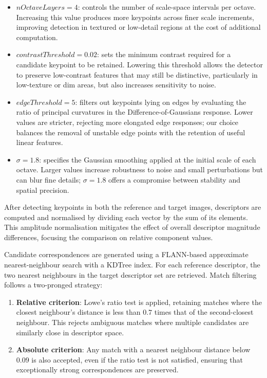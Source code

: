 \begin{itemize}
    \item \textbf{$nOctaveLayers = 4$}: controls the number of scale-space intervals per octave. Increasing this value produces more keypoints across finer scale increments, improving detection in textured or low-detail regions at the cost of additional computation.
    \item \textbf{$contrastThreshold = 0.02$}: sets the minimum contrast required for a candidate keypoint to be retained. Lowering this threshold allows the detector to preserve low-contrast features that may still be distinctive, particularly in low-texture or dim areas, but also increases sensitivity to noise.
    \item \textbf{$edgeThreshold = 5$}: filters out keypoints lying on edges by evaluating the ratio of principal curvatures in the Difference-of-Gaussians response. Lower values are stricter, rejecting more elongated edge responses; our choice balances the removal of unstable edge points with the retention of useful linear features.
    \item \textbf{$\sigma = 1.8$}: specifies the Gaussian smoothing applied at the initial scale of each octave. Larger values increase robustness to noise and small perturbations but can blur fine details; $\sigma = 1.8$ offers a compromise between stability and spatial precision.
\end{itemize}

After detecting keypoints in both the reference and target images, descriptors
are computed and normalised by dividing each vector by the sum of its elements.
This amplitude normalisation mitigates the effect of overall descriptor
magnitude differences, focusing the comparison on relative component values.

Candidate correspondences are generated using a FLANN-based approximate
nearest-neighbour search with a KDTree index. For each reference descriptor,
the two nearest neighbours in the target descriptor set are retrieved. Match
filtering follows a two-pronged strategy:
\begin{enumerate}
    \item \textbf{Relative criterion}: Lowe’s ratio test is applied, retaining matches where the closest neighbour’s distance is less than $0.7$ times that of the second-closest neighbour. This rejects ambiguous matches where multiple candidates are similarly close in descriptor space.
    \item \textbf{Absolute criterion}: Any match with a nearest neighbour distance below $0.09$ is also accepted, even if the ratio test is not satisfied, ensuring that exceptionally strong correspondences are preserved.
\end{enumerate}

